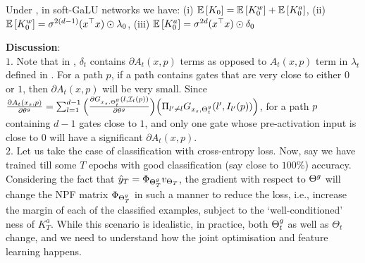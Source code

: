 \begin{lemma} Under , in soft-GaLU networks we have: (i) $\mathbb{E}\left[K_0\right]=\mathbb{E}\left[K^w_0\right]+\mathbb{E}\left[K^a_0\right]$, 
 (ii) $\mathbb{E}\left[K^w_0\right]=\sigma^{2(d-1)} (x^\top x)\odot \lambda_0$,  (iii) $\mathbb{E}\left[K^a_0\right]=\sigma^{2d}  (x^\top x)\odot \delta_0$
\end{lemma}
\textbf{Discussion}: \hfill\\
$1.$ Note that in , $\delta_t$ contains $\partial A_t(x,p)$ terms as opposed to $A_t(x,p)$ term in $\lambda_t$ defined in . For a path $p$, if a path contains gates that are very close to either $0$ or $1$, then $\partial A_t(x,p)$ will be very small. Since $\frac{\partial A_{t}(x_s,p)}{\partial \theta^g}= \sum_{l=1}^{d-1} \Big(\frac{\partial G_{x_s,{\Theta}^g_t}(l,\mathcal{I}_l(p))}{\partial \theta^g} \Big)\Big(\Pi_{l'\neq l} G_{x_s,{\Theta}^g_t}(l',I_{l'}(p))\Big)$, for a path $p$ containing $d-1$ gates close to $1$, and only one gate whose pre-activation input is close to $0$ will have a significant $\partial A_t(x,p)$. \hfill\\
$2.$ Let us take the case of classification with cross-entropy loss. Now, say we have trained till some $T$ epochs with good classification (say close to $100\%$) accuracy. Considering the fact that $\hat{y}_T=\Phi_{{\Theta}^g_T}v_{\Theta_T}$, the gradient with respect to ${\Theta}^g$ will change the NPF matrix $\Phi_{{\Theta}^g_T}$ in such a manner to reduce the loss, i.e., increase the margin of each of the classified examples, subject to the `well-conditioned' ness of $K^a_T$. While this scenario is idealistic, in practice, both ${\Theta}^g_t$ as well as $\Theta_t$ change, and we need to understand how the joint optimisation and feature learning happens.\hfill\\
